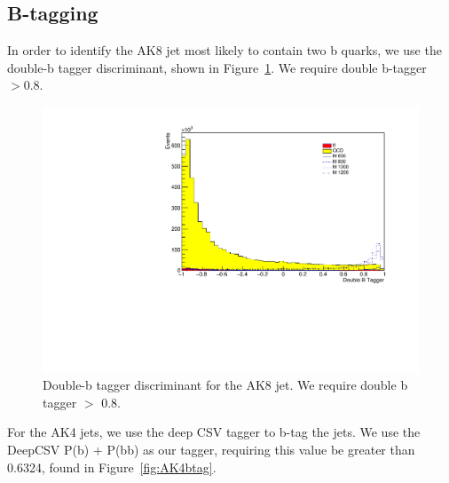 
\subsection{B-tagging}

In order to identify the AK8 jet most likely to contain two b quarks, we use the double-b tagger discriminant, shown in Figure~\ref{fig:doubleb}. We require double b-tagger $> 0.8$.

\begin{figure}[h]
\begin{center}
\includegraphics[scale=0.5]{F5/shapedoubleb.pdf}
\end{center}
\caption{Double-b tagger discriminant for the AK8 jet. We require double b tagger $>$ 0.8.}
\label{fig:doubleb}
\end{figure} 

For the AK4 jets, we use the deep CSV tagger to b-tag the jets. We use the DeepCSV P(b) + P(bb) as our tagger, requiring this value be greater than 0.6324, found in Figure~\ref{fig:AK4btag}. 

